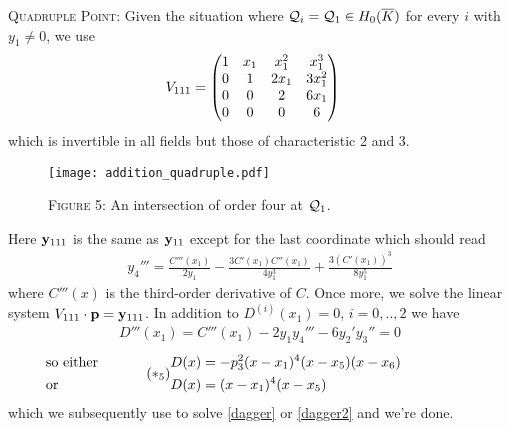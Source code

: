 \documentclass[english,11pt,a4paper]{article}
\begin{document}
\begin{case}
  {\scshape Quadruple Point:} Given the situation where $\mathcal{Q}_i = \mathcal{Q}_1 \in H_0(\overline K)$ for every $i$ with $y_1 \neq 0$, we use
  \begin{align*}V_{111} &=
    \begin{pmatrix}
      1 & x_1 & x_1^2 & x_1^3\\
      0 & 1 & 2 x_1 & 3 x_1^2\\
      0 & 0 & 2 & 6x_1\\
      0 & 0 & 0 & 6\\
    \end{pmatrix}
  \end{align*}
  which is invertible in all fields but those of characteristic 2 and 3.

\begin{figure}[ht!]
  \fline
  \begin{center}
    \vspace{1mm}
    \texttt{[image: addition\_quadruple.pdf]}

    {\scshape Figure 5}: An intersection of order four at $\mathcal{Q}_1$.
  \end{center}
  \vspace{-1.5mm}
  \fline
\end{figure}

  Here $\mathbf{y}_{111}$ is the same as $\mathbf{y}_{11}$ except for the last coordinate which should read
  \begin{align*}
    y_4''' = \frac{C'''(x_1)}{2y_1}-\frac{3C'(x_1)C''(x_1)}{4y_1^3}+\frac{3(C'(x_1))^3}{8y_1^5}
  \end{align*}
  where $C'''(x)$ is the third-order derivative of $C$. Once more, we solve the linear system $V_{111} \cdot \mathbf{p}=\mathbf{y}_{111}$. In addition to $D^{(i)}(x_1)=0$, $i=0,..,2$ we have
  \begin{align*}
    D'''(x_1) = C'''(x_1) - 2 y_1 y_4''' - 6 y_2' y_3'' = 0
  \end{align*}
  \vspace{-6mm}
  \begin{align} \tag{$*_5$} \begin{split}
    \rlap{\hspace{-32.5mm} so either} D(x) &= -p_3^2(x-x_1)^4(x-x_5)(x-x_6) \\
    \rlap{\hspace{-32.5mm} or}  D(x) &= (x-x_1)^4(x-x_5)
  \end{split} \end{align}
  which we subsequently use to solve \eqref{dagger} or \eqref{dagger2} and we're done.
\end{case}
\end{document}
